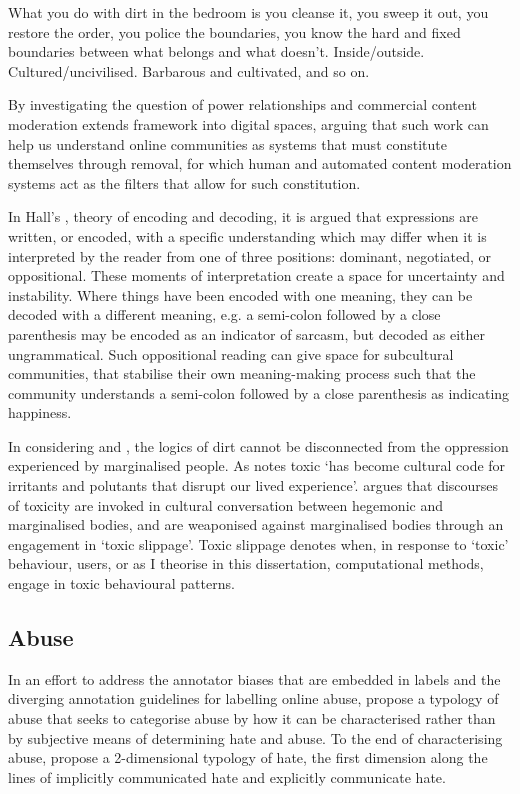 \begin{aquote}
  What you do with dirt in the bedroom is you cleanse it, you sweep it out, you restore the order, you police the boundaries, you know the hard and fixed boundaries between what belongs and what doesn't. Inside/outside. Cultured/uncivilised. Barbarous and cultivated, and so on. \cite[p. 3]{Hall:1999}
\end{aquote}

By investigating the question of power relationships and commercial content moderation \citet{Lepawsky:2019} extends \citet{Douglas:1966} framework into digital spaces, arguing that such work can help us understand online communities as systems that must constitute themselves through removal, for which human and automated content moderation systems act as the filters that allow for such constitution.

In Hall's \citeyear{Hall:1997}, theory of encoding and decoding, it is argued that expressions are written, or encoded, with a specific understanding which may differ when it is interpreted by the reader from one of three positions: dominant, negotiated, or oppositional. These moments of interpretation create a space for uncertainty and instability. Where things have been encoded with one meaning, they can be decoded with a different meaning, e.g. a semi-colon followed by a close parenthesis may be encoded as an indicator of sarcasm, but decoded as either ungrammatical. Such oppositional reading can give space for subcultural communities, that stabilise their own meaning-making process such that the community understands a semi-colon followed by a close parenthesis as indicating happiness.

In considering \cite{Hall:1997} and \cite{Lepawsky:2019}, the logics of dirt cannot be disconnected from the oppression experienced by marginalised people. As \citet{Risam:2015} notes toxic `has become cultural code for irritants and polutants that disrupt our lived experience'. \citet{Risam:2015} argues that discourses of toxicity are invoked in cultural conversation between hegemonic and marginalised bodies, and are weaponised against marginalised bodies through an engagement in `toxic slippage'. Toxic slippage denotes when, in response to `toxic' behaviour, users, or as I theorise in this dissertation, computational methods, engage in toxic behavioural patterns.

\subsection{Abuse}
In an effort to address the annotator biases that are embedded in labels \citep{Waseem:2016} and the diverging annotation guidelines for labelling online abuse, \citet{Waseem:2017} propose a typology of abuse that seeks to categorise abuse by how it can be characterised rather than by subjective means of determining hate and abuse. To the end of characterising abuse, \citet{Waseem:2017} propose a 2-dimensional typology of hate, the first dimension along the lines of implicitly communicated hate and explicitly communicate hate. 

